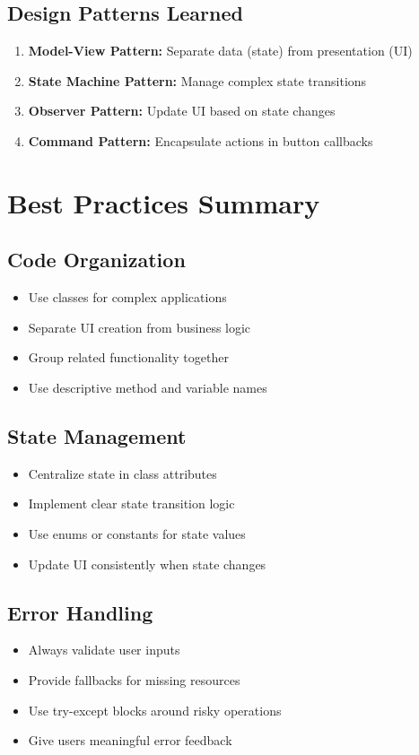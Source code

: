 \documentclass[12pt,a4paper]{article}
\begin{document}
\subsection{Design Patterns Learned}

\begin{enumerate}
    \item \textbf{Model-View Pattern:} Separate data (state) from presentation (UI)
    \item \textbf{State Machine Pattern:} Manage complex state transitions
    \item \textbf{Observer Pattern:} Update UI based on state changes
    \item \textbf{Command Pattern:} Encapsulate actions in button callbacks
\end{enumerate}

\section{Best Practices Summary}

\subsection{Code Organization}
\begin{itemize}
    \item Use classes for complex applications
    \item Separate UI creation from business logic
    \item Group related functionality together
    \item Use descriptive method and variable names
\end{itemize}

\subsection{State Management}
\begin{itemize}
    \item Centralize state in class attributes
    \item Implement clear state transition logic
    \item Use enums or constants for state values
    \item Update UI consistently when state changes
\end{itemize}

\subsection{Error Handling}
\begin{itemize}
    \item Always validate user inputs
    \item Provide fallbacks for missing resources
    \item Use try-except blocks around risky operations
    \item Give users meaningful error feedback
\end{itemize}
\end{document}
